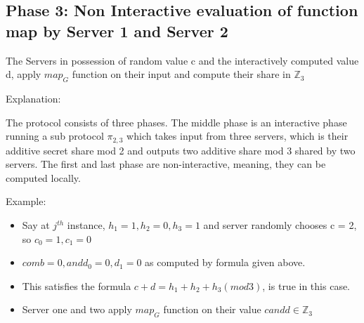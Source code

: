 \documentclass[11pt]{article}
\begin{document}
\subsection{Phase 3: Non Interactive evaluation of function map by Server 1 and Server 2}
The Servers in possession of random value c and the interactively computed value d, apply $map_{G}$ function on their input and compute their share in $\mathbb{Z}_3$

 
Explanation:

The protocol consists of three phases. The middle phase is an interactive phase running a sub protocol $\pi_{2,3}$ which takes input from three servers, which is their additive secret share mod 2 and outputs two additive share mod 3 shared by two servers. The first and last phase are non-interactive, meaning, they can be computed locally. 


Example:

\begin{itemize}
	\item Say at $j^{th}$ instance, $h_{1} = 1, h_{2} = 0, h_{3} = 1$ and server randomly chooses c = 2, so $c_{0} = 1, c_{1} = 0$
	\item $comb = 0, and d_{0} = 0, d_{1} = 0$ as computed by formula given above. 
	\item This satisfies the formula $c + d = h_{1} + h_{2} + h_{3} (mod 3)$, is true in this case.
	\item Server one and two apply $map_{G}$ function on their value $c and d \in \mathbb{Z}_3$
	
\end{itemize}
\end{document}

